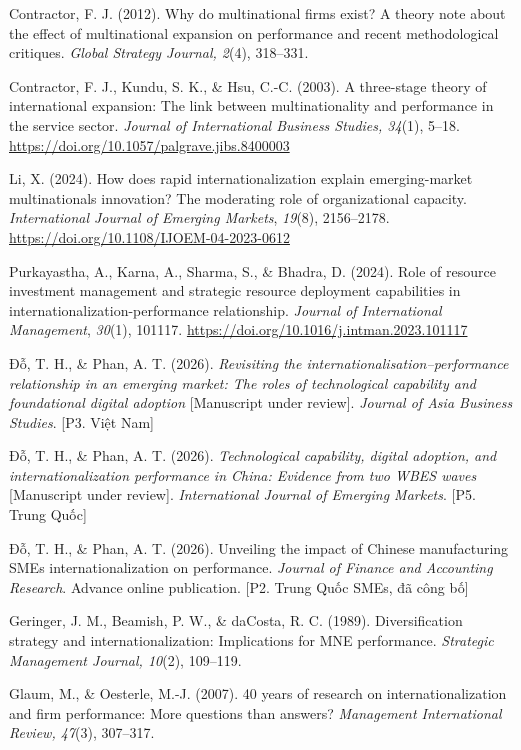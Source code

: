 \documentclass[12pt,a4paper]{article}
\begin{document}
Contractor, F. J. (2012). Why do multinational firms exist? A theory
note about the effect of multinational expansion on performance and
recent methodological critiques. \emph{Global Strategy Journal, 2}(4),
318--331.

Contractor, F. J., Kundu, S. K., \& Hsu, C.-C. (2003). A three-stage
theory of international expansion: The link between multinationality and
performance in the service sector. \emph{Journal of International
Business Studies, 34}(1), 5--18.
\url{https://doi.org/10.1057/palgrave.jibs.8400003}

Li, X. (2024). How does rapid internationalization explain
emerging-market multinationals\textquotesingle{} innovation? The
moderating role of organizational capacity. \emph{International Journal
of Emerging Markets}, \emph{19}(8), 2156--2178.
\url{https://doi.org/10.1108/IJOEM-04-2023-0612}

Purkayastha, A., Karna, A., Sharma, S., \& Bhadra, D. (2024). Role of
resource investment management and strategic resource deployment
capabilities in internationalization-performance relationship.
\emph{Journal of International Management}, \emph{30}(1), 101117.
\url{https://doi.org/10.1016/j.intman.2023.101117}

Đỗ, T. H., \& Phan, A. T. (2026). \emph{Revisiting the
internationalisation--performance relationship in an emerging market:
The roles of technological capability and foundational digital adoption}
{[}Manuscript under review{]}. \emph{Journal of Asia Business Studies}.
{[}P3. Việt Nam{]}

Đỗ, T. H., \& Phan, A. T. (2026). \emph{Technological capability,
digital adoption, and internationalization performance in China:
Evidence from two WBES waves} {[}Manuscript under review{]}.
\emph{International Journal of Emerging Markets}. {[}P5. Trung Quốc{]}

Đỗ, T. H., \& Phan, A. T. (2026). Unveiling the impact of Chinese
manufacturing SMEs\textquotesingle{} internationalization on
performance. \emph{Journal of Finance and Accounting Research}. Advance
online publication. {[}P2. Trung Quốc SMEs, đã công bố{]}

Geringer, J. M., Beamish, P. W., \& daCosta, R. C. (1989).
Diversification strategy and internationalization: Implications for MNE
performance. \emph{Strategic Management Journal, 10}(2), 109--119.

Glaum, M., \& Oesterle, M.-J. (2007). 40 years of research on
internationalization and firm performance: More questions than answers?
\emph{Management International Review, 47}(3), 307--317.
\end{document}

